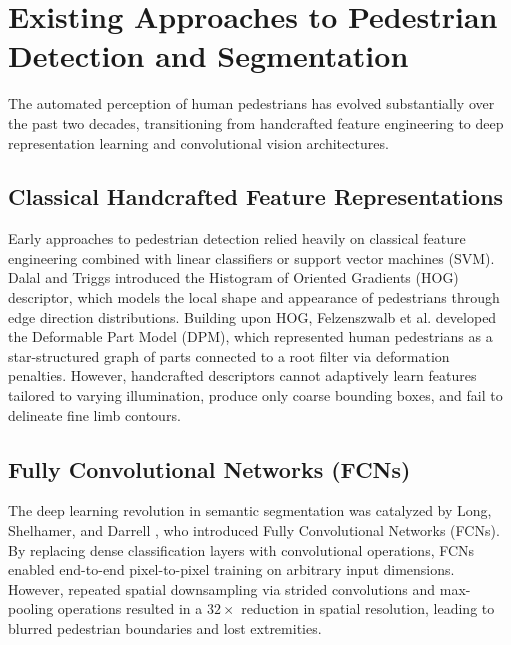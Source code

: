\documentclass[10pt,a4paper]{report}
\begin{document}
\section{Existing Approaches to Pedestrian Detection and Segmentation}
The automated perception of human pedestrians has evolved substantially over the past two decades, transitioning from handcrafted feature engineering to deep representation learning and convolutional vision architectures.

\subsection{Classical Handcrafted Feature Representations}
Early approaches to pedestrian detection relied heavily on classical feature engineering combined with linear classifiers or support vector machines (SVM). Dalal and Triggs \cite{dalal2005hog} introduced the Histogram of Oriented Gradients (HOG) descriptor, which models the local shape and appearance of pedestrians through edge direction distributions. Building upon HOG, Felzenszwalb et al. \cite{felzenszwalb2009dpm} developed the Deformable Part Model (DPM), which represented human pedestrians as a star-structured graph of parts connected to a root filter via deformation penalties. However, handcrafted descriptors cannot adaptively learn features tailored to varying illumination, produce only coarse bounding boxes, and fail to delineate fine limb contours.

\subsection{Fully Convolutional Networks (FCNs)}
The deep learning revolution in semantic segmentation was catalyzed by Long, Shelhamer, and Darrell \cite{long2015fcn}, who introduced Fully Convolutional Networks (FCNs). By replacing dense classification layers with convolutional operations, FCNs enabled end-to-end pixel-to-pixel training on arbitrary input dimensions. However, repeated spatial downsampling via strided convolutions and max-pooling operations resulted in a $32\times$ reduction in spatial resolution, leading to blurred pedestrian boundaries and lost extremities.
\end{document}
